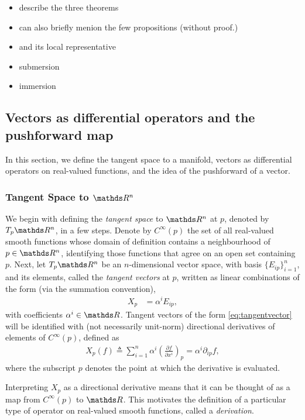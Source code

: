 \begin{itemize}
\item describe the three theorems
\item can also briefly menion the few propositions (without proof.)
\item and its local representative 
\item submersion
\item immersion
\end{itemize}

\subsection{Vectors as differential operators and the pushforward map}
In this section, we define the tangent space to a manifold, vectors as differential operators on real-valued functions, and the idea of the pushforward of a vector. 

\subsubsection{Tangent Space to $\R^n$}

We begin with defining the \textit{tangent space} to $\R^n$ at $p$, denoted by $T_p\R^n$, in a few steps. Denote by $C^{\infty}(p)$ the set of all real-valued smooth functions whose domain of definition contains a neighbourhood of $p\in \R^n$, {identifying} those functions that agree on an open set containing $p$. Next, let $T_p\R^n$ be an $n$-dimensional vector space, with basis $\{E_{ip}\}_{i=1}^{n}$, and its elements, called the \textit{tangent vectors} at $p$, written as linear combinations of the form (via the summation convention),
\begin{align}\label{eq:tangentvector}
X_p &={} \alpha^i E_{ip},
\end{align}
with coefficients $\alpha^i \in \R$. Tangent vectors of the form \ref{eq:tangentvector} will be identified with (not necessarily unit-norm) directional derivatives of elements of $C^{\infty}(p)$, defined as
\begin{equation}
\begin{aligned}
X_p(f) \triangleq \sum_{i = 1}^n \alpha^i \left(\frac{\partial f}{\partial x^i}\right)_p = \alpha^i \partial_{ip} f,
\end{aligned}
\end{equation}
where the subscript $p$ denotes the point at which the derivative is evaluated. 

Interpreting $X_p$ as a directional derivative means that it can be thought of as a map from $C^{\infty}(p)$ to $\R$. This motivates the definition of a particular type of operator on real-valued smooth functions, called a \textit{derivation}. 

